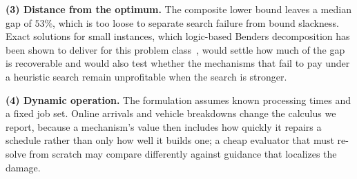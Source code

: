 \documentclass[manuscript,screen,review]{acmart}
\begin{document}
\textbf{(3) Distance from the optimum.} The composite lower bound leaves a median
gap of $53\%$, which is too loose to separate search failure from bound slackness.
Exact solutions for small instances, which logic-based Benders decomposition has
been shown to deliver for this problem class~\cite{vanos2026exact}, would settle
how much of the gap is recoverable and would also test whether the mechanisms that
fail to pay under a heuristic search remain unprofitable when the search is
stronger.

\textbf{(4) Dynamic operation.} The formulation assumes known processing times and
a fixed job set. Online arrivals and vehicle breakdowns change the calculus we
report, because a mechanism's value then includes how quickly it repairs a
schedule rather than only how well it builds one; a cheap evaluator that must
re-solve from scratch may compare differently against guidance that localizes the
damage.







\appendix
\end{document}
